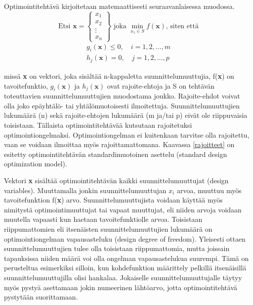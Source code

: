\documentclass[12pt]{article}
\newenvironment{content}{\pagenumbering{arabic}}{}
\begin{document}
\begin{content}
Optimointitehtävä kirjoitetaan matemaattisesti seuraavanlaisessa muodossa.
\begin{equation}
\label{optimointi_määrittely}
\text{Etsi } \textbf{x} = 
\begin{Bmatrix} 
x_1 \\ 
x_2 \\ 
\vdots \\
x_n  
\end{Bmatrix}
\text{    joka } \min_{x_1 \in S} f(\textbf{x}) \text{, siten että}
\end{equation}
\begin{equation}
\label{rajoitteet}
\begin{split}
g_i(\textbf{x}) \leq 0, \quad i = 1,2, \dots , m  \\ 
h_j(\textbf{x}) = 0, \quad j = 1,2, \dots , p
\end{split}
\end{equation}

missä \textbf{x} on vektori, joka sisältää n-kappaletta suunnittelumuuttujia, f(\textbf{x}) on tavoitefunktio, $g_i(\textbf{x})$ ja $h_j(\textbf{x})$ ovat rajoite-ehtoja ja S on tehtävän toteuttavien suunnittelumuuttujien muodostama joukko. Rajoite-ehdot voivat olla joko epäyhtälö- tai yhtälömuotoisesti ilmoitettuja. Suunnittelumuuttujien lukumäärä (n) sekä rajoite-ehtojen lukumäärä (m ja/tai p) eivät ole riippuvaisia toisistaan. Tällaista optimointitehtävää kutsutaan rajoitetuksi optimointiongelmaksi. Optimointiongelman ei kuitenkaan tarvitse olla rajoitettu, vaan se voidaan ilmoittaa myös rajoittamattomana. Kaavassa \eqref{rajoitteet} on esitetty optimointitehtävän standardimuotoinen asettelu (standard design optimization model). \parencite[6]{rao}

Vektori \textbf{x} sisältää optimointitehtävän kaikki suunnittelumuuttujat (design variables). Muuttamalla jonkin suunnittelumuuttujan $x_i$ arvoa, muuttuu myös tavoitefunktion f(\textbf{x}) arvo. Suunnittelumuuttujista voidaan käyttää myös nimitystä optimointimuuttujat tai vapaat muuttujat, eli niiden arvoja voidaan muutella vapaasti kun haetaan tavoitefunktiolle arvoa. Toisistaan riippumattomien eli itsenäisten suunnittelumuuttujien lukumäärä on optimointiongelman vapausasteluku (design degree of freedom). Yleisesti ottaen suunnittelumuuttujien tulee olla toisistaan riippumattomia, mutta joissain tapauksissa niiden määrä voi olla ongelman vapausastelukua suurempi. Tämä on perusteltua esimerkiksi silloin, kun kohdefunktion määrittely pelkillä itsenäisillä suunnittelumuuttujilla olisi hankalaa. Jokaiselle suunnittelumuuttujalle täytyy myös pystyä asettamaan jokin numeerinen lähtöarvo, jotta optimointitehtävä pystytään suorittamaan. 


\end{content}
\end{document}
